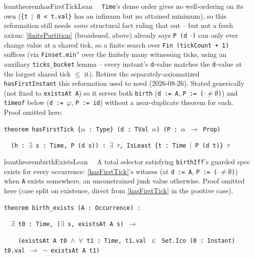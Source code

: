 \begin{restatable}{leantheorem}{hasFirstTickLean}~~ \texttt{Time}'s dense order gives
no well-ordering on its own (\texttt{\{t $\mid$ 0 < t.val\}} has an infimum but no attained minimum), so this
reformation still needs \emph{some} structural fact ruling that out -- but not a fresh axiom: \ref{finitePartition}
(broadened, above) already says \texttt{P (d $\cdot$)} can only ever change value at a shared tick, so a finite
search over \texttt{Fin (tickCount + 1)} suffices (via \texttt{Finset.min'} over the finitely many
witnessing ticks, using an auxiliary \texttt{ticks\_bucket} lemma -- every instant's \texttt{d}-value matches
the \texttt{d}-value at the largest shared tick $\le$ it). Retires the separately-axiomatized
\texttt{hasFirstInstant} this reformation used to need (2026-08-26). Stated generically (not fixed to
\texttt{existsAt A}) so it serves both \texttt{birth} (\texttt{d := A}, \texttt{P := ($\cdot \ne \emptyset$)})
and \texttt{timeof} below (\texttt{d := $\varphi$}, \texttt{P := id}) without a near-duplicate theorem for
each. Proof omitted here.

\texttt{\textcolor{leancolor}{theorem} \textcolor{leanyellow}{hasFirstTick} \{$\alpha$ : Type\} (d : TVal $\alpha$) (P : $\alpha$ $\to$ Prop)}

\texttt{~~(h : $\exists$ s : Time, P (d s)) : $\exists$ $\tau$, IsLeast \{t : Time $\mid$ P (d t)\} $\tau$}
\label{hasFirstTick}
\end{restatable}

\begin{restatable}{leantheorem}{birthExistsLean}~~ A total selector satisfying
\texttt{birthIff}'s guarded spec exists for every occurrence: \ref{hasFirstTick}'s witness (at
\texttt{d := A}, \texttt{P := ($\cdot \ne \emptyset$)}) when \texttt{A} exists somewhere, an unconstrained
junk value otherwise. Proof omitted here (case split on existence, direct from \ref{hasFirstTick} in the
positive case).

\texttt{\textcolor{leancolor}{theorem} \textcolor{leanyellow}{birth\_exists} (A : Occurrence) :}

\texttt{~~$\exists$ t0 : Time, ($\exists$ s, existsAt A s) $\to$}

\texttt{~~~~(existsAt A t0 $\wedge$ $\forall$ t1 : Time, t1.val $\in$ Set.Ico (0 : Instant) t0.val $\to$ $\lnot$ existsAt A t1)}
\label{birth_exists}
\end{restatable}

